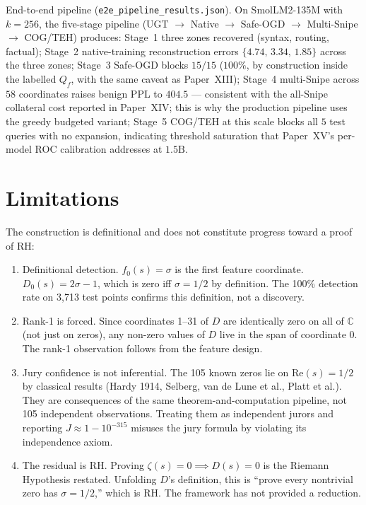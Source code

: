 \documentclass[11pt]{article}
\begin{document}
End-to-end pipeline (\texttt{e2e\_pipeline\_results.json}).
On SmolLM2-135M with $k{=}256$, the five-stage pipeline
(UGT $\to$ Native $\to$ Safe-OGD $\to$ Multi-Snipe $\to$ COG/TEH)
produces: Stage~1 three zones recovered (syntax, routing, factual);
Stage~2 native-training reconstruction errors
$\{4.74,\,3.34,\,1.85\}$ across the three zones;
Stage~3 Safe-OGD blocks $15/15$ ($100\%$, by construction inside the
labelled $Q_f$, with the same caveat as Paper~XIII);
Stage~4 multi-Snipe across $58$ coordinates raises benign PPL to
$404.5$ --- consistent with the all-Snipe collateral cost reported
in Paper~XIV; this is why the production pipeline uses the greedy
budgeted variant; Stage~5 COG/TEH at this scale blocks all $5$ test
queries with no expansion, indicating threshold saturation that
Paper~XV's per-model ROC calibration addresses at $1.5\mathrm{B}$.

\section{Limitations}

The construction is definitional and does not constitute progress toward a proof of RH:

\begin{enumerate}[nosep]
\item Definitional detection. $f_0(s) = \sigma$ is the first feature coordinate. $D_0(s) = 2\sigma-1$, which is zero iff $\sigma=1/2$ by definition. The 100\% detection rate on 3,713 test points confirms this definition, not a discovery.
\item Rank-1 is forced. Since coordinates 1--31 of $D$ are identically zero on all of $\mathbb{C}$ (not just on zeros), any non-zero values of $D$ live in the span of coordinate 0. The rank-1 observation follows from the feature design.
\item Jury confidence is not inferential. The 105 known zeros lie on $\mathrm{Re}(s)=1/2$ by classical results (Hardy 1914, Selberg, van de Lune et al., Platt et al.). They are consequences of the same theorem-and-computation pipeline, not 105 independent observations. Treating them as independent jurors and reporting $J\approx 1-10^{-315}$ misuses the jury formula by violating its independence axiom.
\item The residual is RH. Proving $\zeta(s)=0 \implies D(s)=0$ is the Riemann Hypothesis restated. Unfolding $D$'s definition, this is ``prove every nontrivial zero has $\sigma=1/2$,'' which is RH. The framework has not provided a reduction.
\end{enumerate}
\end{document}
